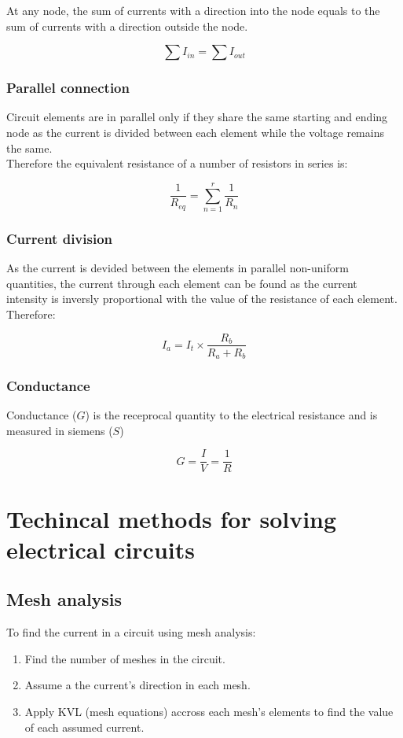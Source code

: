 \documentclass[a4paper]{book}
\begin{document}
\noindent At any node, the sum of currents with a direction into the node equals to the sum of
currents with a direction outside the node.

\[\sum I_{in} = \sum I_{out}\]

\subsubsection{Parallel connection}

Circuit elements are in parallel only if they share the same starting and ending node as the current is 
divided between each element while the voltage remains the same.\\
Therefore the equivalent resistance of a number of resistors in series is:

\[\frac{1}{R_{eq}} = \sum_{n=1}^r \frac{1}{R_n}\]

\subsubsection{Current division}

As the current is devided between the elements in parallel non-uniform quantities, the current through
each element can be found as the current intensity is inversly proportional with the value of the resistance of each element. Therefore:

\[I_a = I_{t} \times \frac{R_b}{R_a + R_b}\]

\subsubsection{Conductance}

Conductance ($G$) is the receprocal quantity to the electrical resistance and is measured in siemens ($S$)

\[G = \frac{I}{V} = \frac{1}{R}\]

\section{Techincal methods for solving electrical circuits}

\subsection{Mesh analysis}

To find the current in a circuit using mesh analysis:

\begin{enumerate}

  \item Find the number of meshes in the circuit.
  \item Assume a the current's direction in each mesh.
  \item Apply KVL (mesh equations) accross each mesh's elements to find the value of each assumed current.

\end{enumerate}
\end{document}
